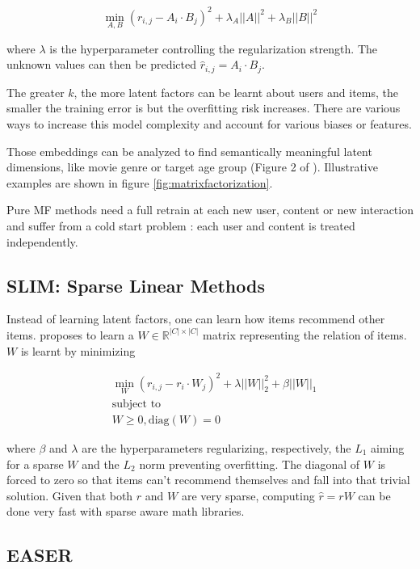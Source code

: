 $$ \min_{A, B} (r_{i,j} - A_i \cdot B_j)^2 + \lambda_A ||A||^2+\lambda_B||B||^2$$

where $\lambda$ is the hyperparameter controlling the regularization strength. The unknown values can then be predicted $\hat{r}_{i,j} = A_i \cdot B_j$.

The greater $k$, the more latent factors can be learnt about users and items, the smaller the training error is but the overfitting risk increases. There are various ways to increase this model complexity and account for various biases or features.

Those embeddings can be analyzed to find semantically meaningful latent dimensions, like movie genre or target age group (Figure 2 of \citep{mflatents}). Illustrative examples are shown in figure \ref{fig:matrixfactorization}.

Pure MF methods need a full retrain at each new user, content or new interaction and suffer from a cold start problem : each user and content is treated independently. 

\subsection{SLIM: Sparse Linear Methods}

Instead of learning latent factors, one can learn how items recommend other items. \citet{slim} proposes to learn a $W \in \mathbb{R}^{|C|\times|C|}$ matrix representing the relation of items. $W$ is learnt by minimizing

\begin{equation}
\begin{split}
    & \min_W (r_{i,j} - r_i \cdot W_j)^2 + \lambda ||W||^2_2 + \beta ||W||_1 \\
    & \text{subject to} \\
    & W \geq 0, \text{diag}(W) = 0
\end{split}
\end{equation}

where $\beta$ and $\lambda$ are the hyperparameters regularizing, respectively, the $L_1$ aiming for a sparse $W$ and the $L_2$ norm preventing overfitting. The diagonal of $W$ is forced to zero so that items can't recommend themselves and fall into that trivial solution. Given that both $r$ and $W$ are very sparse, computing $\hat{r}=rW$ can be done very fast with sparse aware math libraries.

\subsection{\acf{EASER}}


